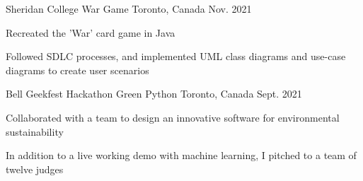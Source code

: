 \begin{cventries}
  \cventry
    {Sheridan College}
    {War Game}
    {Toronto, Canada}
    {Nov. 2021}
    {
      \begin{cvitems}
        \item {Recreated the 'War' card game in Java 
        \item Followed SDLC processes, and implemented UML class diagrams and use-case diagrams to create user scenarios}
      \end{cvitems}
    }
  \cventry
    {Bell Geekfest Hackathon}
    {Green Python}
    {Toronto, Canada}
    {Sept. 2021}
    {
      \begin{cvitems}
        \item {Collaborated with a team to design an innovative software for environmental sustainability
        \item In addition to a live working demo with machine learning, I pitched to a team of twelve judges}
      \end{cvitems}
    }
\end{cventries}
